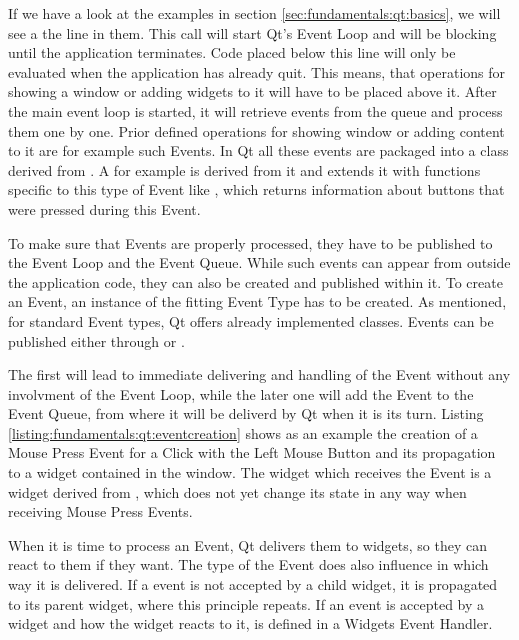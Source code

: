 If we have a look at the examples in section \ref{sec:fundamentals:qt:basics}, we will see a the line  in them. This call will start Qt's Event Loop and will be blocking until the application terminates. Code placed below this line will only be evaluated when the application has already quit. This means, that operations for showing a window or adding widgets to it will have to be placed above it. After the main event loop is started, it will retrieve events from the queue and process them one by one. Prior defined operations for showing window or adding content to it are for example such Events. In Qt all these events are packaged into a class derived from . A  for example is derived from it and extends it with functions specific to this type of Event like , which returns information about buttons that were pressed during this Event.

To make sure that Events are properly processed, they have to be published to the Event Loop and the Event Queue. While such events can appear from outside the application code, they can also be created and published within it. To create an Event, an instance of the fitting Event Type has to be created. As mentioned, for standard Event types, Qt offers already implemented classes. Events can be published either through  or . 

The first will lead to immediate delivering and handling of the Event without any involvment of the Event Loop, while the later one will add the Event to the Event Queue, from where it will be deliverd by Qt when it is its turn. Listing \ref{listing:fundamentals:qt:eventcreation} shows as an example the creation of a Mouse Press Event for a Click with the Left Mouse Button and its propagation to a widget contained in the window. The widget which receives the Event is a widget derived from , which does not yet change its state in any way when receiving Mouse Press Events.



When it is time to process an Event, Qt delivers them to widgets, so they can react to them if they want. The type of the Event does also influence in which way it is delivered. If a event is not accepted by a child widget, it is propagated to its parent widget, where this principle repeats. If an event is accepted by a widget and how the widget reacts to it, is defined in a Widgets Event Handler.

